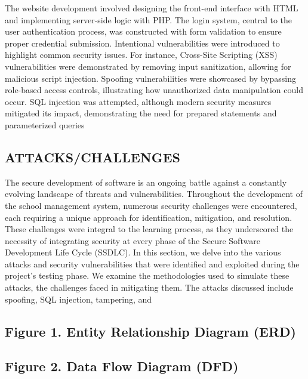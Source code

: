 \documentclass[letterpaper,twocolumn]{article}
\begin{document}
The website development involved designing the front-end interface with HTML and implementing server-side logic with PHP. The login system, central to the user authentication process, was constructed with form validation to ensure proper credential submission. Intentional vulnerabilities were introduced to highlight common security issues. For instance, Cross-Site Scripting (XSS) vulnerabilities were demonstrated by removing input sanitization, allowing for malicious script injection. Spoofing vulnerabilities were showcased by bypassing role-based access controls, illustrating how unauthorized data manipulation could occur. SQL injection was attempted, although modern security measures mitigated its impact, demonstrating the need for prepared statements and parameterized queries
\subsection{ATTACKS/CHALLENGES}
The secure development of software is an ongoing battle against a constantly evolving landscape of threats and vulnerabilities. Throughout the development of the school management system, numerous security challenges were encountered, each requiring a unique approach for identification, mitigation, and resolution. These challenges were integral to the learning process, as they underscored the necessity of integrating security at every phase of the Secure Software Development Life Cycle (SSDLC).
In this section, we delve into the various attacks and security vulnerabilities that were identified and exploited during the project's testing phase. We examine the methodologies used to simulate these attacks, the challenges faced in mitigating them. The attacks discussed include spoofing, SQL injection, tampering, and

\subsection{Figure 1. Entity Relationship Diagram (ERD)}

\subsection{Figure 2. Data Flow Diagram (DFD)}
\end{document}

